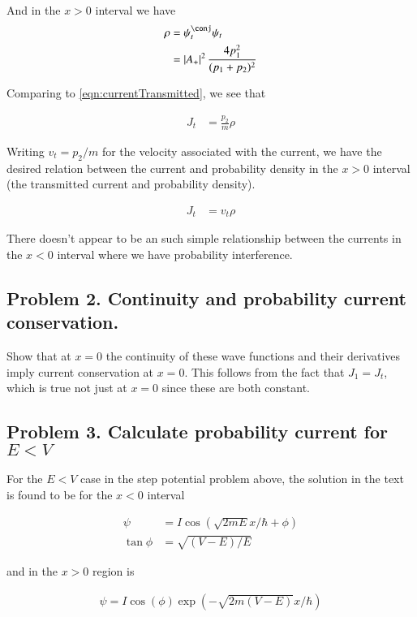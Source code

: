 \documentclass{article}
\begin{document}
And in the $x>0$ interval we have
\begin{align*}
\rho
&= \psi_t^\conj \psi_t \\
&=
\Abs{A_{+}}^2 \frac{4 p_1^2 }{(p_1 + p_2)^2}
\end{align*}

Comparing to \ref{eqn:currentTransmitted}, we see that

\begin{align*}
J_t &= \frac{ p_2 }{ m } \rho
\end{align*}

Writing $v_t = p_2/m$ for the velocity associated with the current, we have
the desired relation between the current and probability density in the $x>0$ interval (the transmitted current and probability density).

\begin{align*}
J_t &= v_t \rho
\end{align*}

There doesn't appear to be an such simple relationship between the currents
in the $x<0$ interval where we have probability interference.

\subsection{ Problem 2.  Continuity and probability current conservation. }

Show that at $x=0$ the continuity of these wave functions and their derivatives 
imply current conservation at $x=0$.  This follows from the fact that $J_1 = J_t$, which is
true not just at $x=0$ since these are both constant.

\subsection{ Problem 3.  Calculate probability current for $E<V$ }

For the $E<V$ case in the step potential problem above, the solution in the 
text is found to be for the $x<0$ interval

\begin{align*}
\psi &= I \cos\left( \sqrt{2mE} x/\hbar + \phi \right) \\
\tan\phi &= \sqrt{(V-E)/E}
\end{align*}

and in the $x>0$ region is

\begin{align*}
\psi = I \cos\left( \phi \right) \exp\left( -\sqrt{2m(V-E)} x/\hbar \right)
\end{align*}
\end{document}
